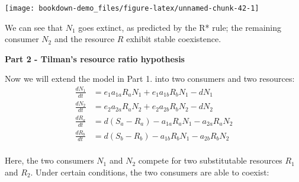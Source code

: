 \documentclass[
]{book}
\begin{document}
\begin{center}\texttt{[image: bookdown-demo\_files/figure-latex/unnamed-chunk-42-1]} \end{center}

We can see that \(N_1\) goes extinct, as predicted by the R* rule; the remaining consumer \(N_2\) and the resource \(R\) exhibit stable coexistence.

\textbf{Part 2 - Tilman's resource ratio hypothesis}

Now we will extend the model in Part 1. into two consumers and two resources:
\begin{align*}
\frac {dN_{1}}{dt} &= e_{1}a_{1a}R_{a}N_{1}+e_{1}a_{1b}R_{b}N_{1}-dN_{1}\\
\frac {dN_{2}}{dt} &= e_{2}a_{2a}R_{a}N_{2}+e_{2}a_{2b}R_{b}N_{2}-dN_{2}\\
\frac {dR_{a}}{dt} &= d(S_{a}-R_{a})-a_{1a}R_{a}N_{1}-a_{2a}R_{a}N_{2}\\
\frac {dR_{b}}{dt} &= d(S_{b}-R_{b})-a_{1b}R_{b}N_{1}-a_{2b}R_{b}N_{2}\\
\end{align*}

Here, the two consumers \(N_1\) and \(N_2\) compete for two substitutable resources \(R_1\) and \(R_2\). Under certain conditions, the two consumers are able to coexist:
\end{document}
